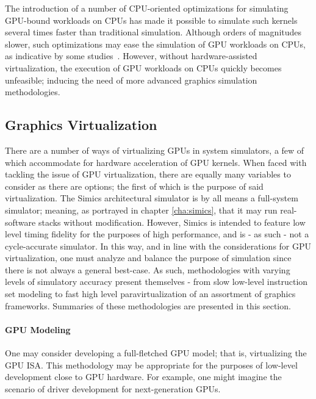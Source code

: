 The introduction of a number of CPU-oriented optimizations for simulating GPU-bound workloads on CPUs has made it possible to simulate such kernels several times faster than traditional simulation.
Although orders of magnitudes slower, such optimizations may ease the simulation of GPU workloads on CPUs, as indicative by some studies~.
However, without hardware-assisted virtualization, the execution of GPU workloads on CPUs quickly becomes unfeasible; inducing the need of more advanced graphics simulation methodologies.

\subsection{Graphics Virtualization}
\label{sec:backgroundandrelatedwork_graphicsvirtualization}
There are a number of ways of virtualizing GPUs in system simulators, a few of which accommodate for hardware acceleration of GPU kernels.
When faced with tackling the issue of GPU virtualization, there are equally many variables to consider as there are options; the first of which is the purpose of said virtualization.
The Simics architectural simulator is by all means a full-system simulator; meaning, as portrayed in chapter \ref{cha:simics}, that it may run real-software stacks without modification.
However, Simics is intended to feature low level timing fidelity for the purposes of high performance, and is - as such - not a cycle-accurate simulator.
In this way, and in line with the considerations for GPU virtualization, one must analyze and balance the purpose of simulation since there is not always a general best-case.
As such, methodologies with varying levels of simulatory accuracy present themselves - from slow low-level instruction set modeling to fast high level paravirtualization of an assortment of graphics frameworks.
Summaries of these methodologies are presented in this section.

\paragraph{GPU Modeling}
\label{par:backgroundandrelatedwork_graphicsvirtualization_gpumodeling}
One may consider developing a full-fletched GPU model; that is, virtualizing the GPU ISA.
This methodology may be appropriate for the purposes of low-level development close to GPU hardware.
For example, one might imagine the scenario of driver development for next-generation GPUs.

